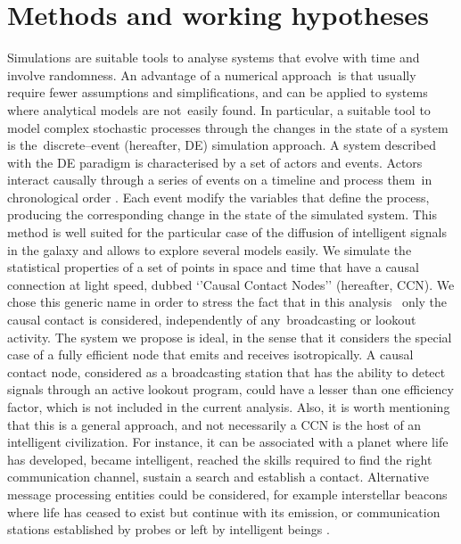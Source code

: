 \documentclass[crop]{CSLB}
\newcommand{\ceti}{CCN}
\begin{document}
\section{Methods and working hypotheses}\label{S_methods}

Simulations are suitable tools to analyse systems that evolve with time and involve randomness.
%
An advantage of a numerical approach is that usually require fewer assumptions and simplifications, and can be applied to systems where analytical models are not easily found.
%
In particular, a suitable tool to model complex stochastic processes through the changes in the state of a system is the discrete--event (hereafter, DE) simulation approach.
%
A system described with the DE paradigm is characterised by a set of actors and events.
%
Actors interact causally through a series of events on a timeline and process them in chronological order \citep{ptolemaeus_system_2014, chung_simulation_2003, ross_simulation_2012}.
%
Each event modify the variables that define the process, producing the corresponding change in the state of the simulated system.
%
This method is well suited for the particular case of the diffusion of intelligent signals in the galaxy and allows to explore several models easily.
%
We simulate the statistical properties of a set of points in space and time that have a causal connection at light speed, dubbed ‘’Causal Contact Nodes’’ (hereafter, \ceti{}).
%
We chose this generic name in order to stress the fact that in this analysis 
only the causal contact is considered, independently of any broadcasting or lookout activity.
%
The system we propose is ideal, in the sense that it considers the special case of a fully efficient node that emits and receives isotropically.
%
A causal contact node, considered as a broadcasting station that has the ability to detect signals through an active lookout program, could have a lesser than one efficiency factor, which is not included in the current analysis.
%
Also, it is worth mentioning that this is a general approach, and not necessarily a \ceti{} is the host of an intelligent civilization.
%
For instance, it can be associated with a planet where life has developed, became intelligent, reached the skills required to find the right communication channel, sustain a search and establish a contact.
%
Alternative message processing entities could be considered, for example interstellar beacons where life has ceased to exist but continue with its emission, or communication stations established by probes or left by intelligent beings \citep[see, e.g., ][]{peters_outer_2018, barlow_galactic_2013}.
\end{document}
